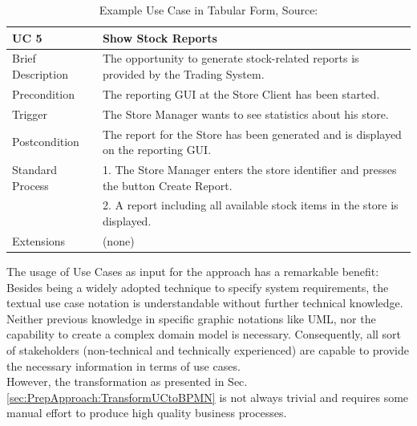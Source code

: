 \begin{table}[!h]
	\centering
	\begin{tabularx}{\textwidth}{|l||X|}
		\hline
	    UC 5 & Show Stock Reports \\ 
	    \hline
	    Brief Description &  The opportunity to generate stock-related reports is provided
	    by the Trading System. \\
	    \hline
	    Precondition & The reporting GUI at the Store Client has been started. \\
	    \hline
	    Trigger & The Store Manager wants to see statistics about his store. \\
	    \hline
	    Postcondition & The report for the Store has been generated and is displayed on
	    the reporting GUI. \\
	    \hline 
	    Standard Process &
	       
	            1. The Store Manager enters the store identifier and presses the button Create
	                     Report.  \\
	           & 2. A report including all available stock items in the store is displayed. \\  
        \hline
        Extensions & (none) \\ \hline
	   
		
	\end{tabularx}
	\caption{Example Use Case in Tabular Form, Source: \cite{CoCoMEOld}}
	\label{tab:exampleUseCase}
	
\end{table}

\noindent
The usage of Use Cases as input for the approach has a remarkable benefit: Besides being a widely adopted technique to specify system requirements, the textual use case notation is understandable without further technical knowledge. Neither previous knowledge in specific graphic notations like UML, nor the capability to create a complex domain model is necessary. Consequently, all sort of stakeholders (non-technical and technically experienced) are capable to provide the necessary information in terms of use cases. \\
However, the transformation as presented in Sec.\ref{sec:PrepApproach:TransformUCtoBPMN} is not always trivial and requires some manual effort to produce high quality business processes. 





